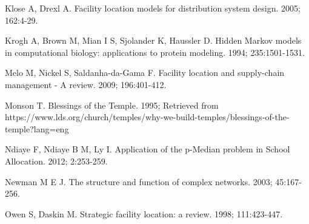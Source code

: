 \documentclass[twoside,twocolumn]{article}
\begin{document}
\begin{thebibliography}{99}
Klose A, Drexl A.
\newblock Facility location models for distribution system design.
 2005; 162:4-29.

Krogh A, Brown M, Mian I S, Sjolander K, Haussler D.
\newblock Hidden Markov models in computational biology: applications to protein modeling.
 1994; 235:1501-1531.

Melo M, Nickel S, Saldanha-da-Gama F.
\newblock Facility location and supply-chain management - A review.
  2009; 196:401-412.

Monson T.
\newblock Blessings of the Temple. 1995;
\newblock Retrieved from https://www.lds.org/church/temples/why-we-build-temples/blessings-of-the-temple?lang=eng

Ndiaye F, Ndiaye B M, Ly I.
\newblock Application of the p-Median problem in School Allocation.
 2012; 2:253-259.

Newman M E J.
\newblock The structure and function of complex networks.
 2003; 45:167-256.

Owen S, Daskin M.
\newblock Strategic facility location: a review.
 1998; 111:423-447.

\end{thebibliography}
\end{document}
